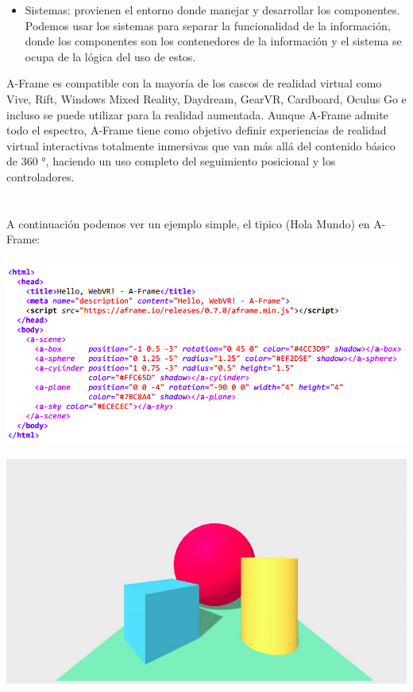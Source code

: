 \documentclass[a4paper, 12pt]{book}
\begin{document}
\begin{itemize}
    \item  Sistemas: provienen el entorno donde manejar y desarrollar los componentes. Podemos usar los sistemas para separar la funcionalidad de la información, donde los componentes son los contenedores de la información y el sistema se ocupa de la lógica del uso de estos.

\end{itemize}

A-Frame es compatible con la mayoría de los cascos de realidad virtual como Vive, Rift, Windows Mixed Reality, Daydream, GearVR, Cardboard, Oculus Go e incluso se puede utilizar para la realidad aumentada. Aunque A-Frame admite todo el espectro, A-Frame tiene como objetivo definir experiencias de realidad virtual interactivas totalmente inmersivas que van más allá del contenido básico de 360 °, haciendo un uso completo del seguimiento posicional y los controladores.
\\
\\
\\
A continuación podemos ver un ejemplo simple, el tipico (Hola Mundo) en A-Frame:

  \includegraphics[scale=0.49]{img/code_escena1.png}
 
 \includegraphics[scale=0.5]{img/escena1.png}
\end{document}
